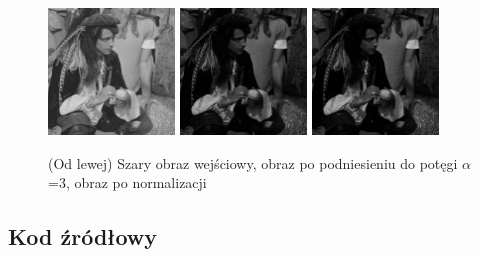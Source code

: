 \documentclass[final,a4paper,openany,12pt]{mwbk}
\begin{document}
\begin{figure}[H]
	\begin{center}
		\includegraphics[width=0.3\textwidth]{2/2Gray_Pow_Original}
		\includegraphics[width=0.3\textwidth]{2/2Gray_Pow_Result}
		\includegraphics[width=0.3\textwidth]{2/2Gray_Pow_Result_Norm}
	\end{center}
	\caption{(Od lewej) Szary obraz wejściowy, obraz po podniesieniu do potęgi $\alpha$=3, obraz po normalizacji }
\end{figure}

\subsection*{Kod źródłowy}
\end{document}
